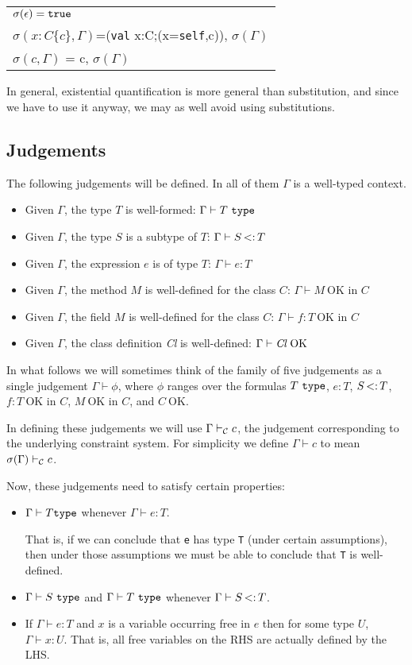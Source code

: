 \documentclass[preprint,nocopyrightspace,9pt]{sigplanconf}
\def\self{\mbox{\tt self}}
\def\type{\mbox{\tt type}}
\begin{document}
\begin{tabular}{l}
$\sigma(\epsilon)={\tt true}$\\
$\sigma(x:C\{c\}, \Gamma)$=({\tt val} x:C;(x=\self,c)), $\sigma(\Gamma)$\\
$\sigma(c,\Gamma)$ = c, $\sigma(\Gamma)$
\end{tabular}

In general, existential quantification is more general than
substitution, and since we have to use it anyway, we may as well avoid
using substitutions.

\subsection{Judgements}

The following judgements will be defined. In all of them $\Gamma$ is a
well-typed context.
\begin{itemize}
  \item Given $\Gamma$, the type $T$ is well-formed: $\Gamma \vdash T
  \ {\tt type}$
  \item Given $\Gamma$, the type $S$ is a subtype of $T$: $\Gamma \vdash S \subtype T$
  \item Given $\Gamma$, the expression $e$ is of type $T$: $\Gamma
  \vdash e:T$
  \item Given $\Gamma$, the method $M$ is well-defined for the class $C$: 
  $\Gamma \vdash M\ \mbox{OK in $C$}$
  \item Given $\Gamma$, the field $M$ is well-defined for the class $C$:
    $\Gamma \vdash f:T\ \mbox{OK in $C$}$
  \item Given $\Gamma$, the class definition \mbox{\em Cl} is well-defined: $\Gamma \vdash \mbox{{\em Cl}\ OK}$
\end{itemize}


In what follows we will sometimes think of the family of five
judgements as a single judgement $\Gamma \vdash \phi$, where $\phi$
ranges over the formulas $T\ \tt type$, $e:T$, $S \subtype T$, $f:T\
\mbox{OK in $C$}$, $M\ \mbox{OK in $C$}$, and $C\ \mbox{OK}$.

In defining these judgements we will use $\Gamma \vdash_{\cal C} c$,
the judgement corresponding to the underlying constraint system. For simplicity
we define $\Gamma \vdash c$ to mean $\sigma(\Gamma)\vdash_{\cal C} c$.

Now, these judgements need to satisfy certain properties:
\begin{itemize}
  \item $\Gamma \vdash T {\tt type}$ whenever $\Gamma \vdash e:T$. 

That is, if we can conclude that {\tt e} has type {\tt T} (under
certain assumptions), then under those assumptions we must be able to
conclude that {\tt T} is well-defined.

\item $\Gamma \vdash S\ \type$ and $\Gamma \vdash T\ \type$ whenever $\Gamma \vdash
S \subtype T$.
\item If $\Gamma \vdash e:T$ and $x$ is a variable occurring free in
$e$ then for some type $U$, $\Gamma \vdash x:U$. That is, all free
variables on the RHS are actually defined by the LHS.
\end{itemize}
\end{document}
